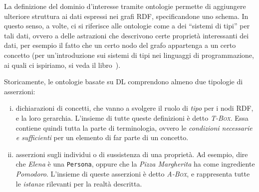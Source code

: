 La definizione del dominio d'interesse tramite ontologie permette di aggiungere ulteriore struttura ai dati espressi nei grafi RDF, specificandone uno schema.
In questo senso, a volte, ci si riferisce alle ontologie come a dei “sistemi di tipi” per tali dati, ovvero a delle astrazioni che descrivono certe proprietà interessanti dei dati, per esempio il fatto che un certo nodo del grafo appartenga a un certo concetto (per un'introduzione sui sistemi di tipi nei linguaggi di programmazione, ai quali ci ispiriamo, si veda il libro~\cite{TypesAndProgrammingLanguages}). 

Storicamente, le ontologie basate su DL comprendono almeno due tipologie di asserzioni:
\begin{enumerate}[i)]
	\item dichiarazioni di concetti, che vanno a svolgere il ruolo di \textit{tipo} per i nodi RDF, e la loro gerarchia. L'insieme di tutte queste definizioni è detto \textsc{\itshape T-Box}. Essa contiene quindi tutta la parte di terminologia, ovvero le \textit{condizioni necessarie e sufficienti} per un elemento di far parte di un concetto.
	\item asserzioni sugli individui o di sussistenza di una proprietà. Ad esempio, dire che \textsl{Elena} è una \texttt{Persona}, oppure che la \textsl{Pizza Margherita} ha come ingrediente \textsl{Pomodoro}. L'insieme di queste asserzioni è detto \textsc{\itshape A-Box}, e rappresenta tutte le \textit{istanze} rilevanti per la realtà descritta.
\end{enumerate}